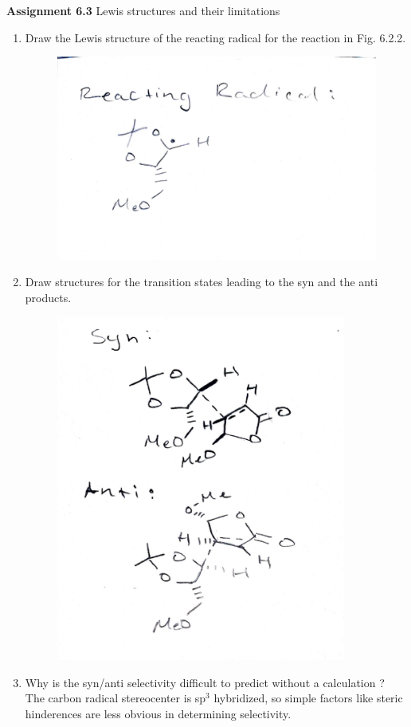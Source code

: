 \documentclass{article}
\begin{document}
\textbf{Assignment 6.3}
Lewis structures and their limitations
\begin{enumerate}
	\item Draw the Lewis structure of the reacting radical for the reaction in Fig. 6.2.2.
		\begin{figure}[h]
			\centering
			\includegraphics[width=\textwidth]{images/reacting-radical.pdf}
		\end{figure}
\newpage
	\item Draw structures for the transition states leading to the syn and the anti products.
		\begin{figure}[h]
			\centering
			\includegraphics[width=0.9\textwidth]{images/syn-anti.pdf}
		\end{figure}

	\item Why is the syn/anti selectivity difficult to predict without a calculation ? \\
	The carbon radical stereocenter is sp$^3$ hybridized, so simple factors like steric hinderences are less obvious in determining selectivity.
	
\end{enumerate}

\enddocument
\end{document}
